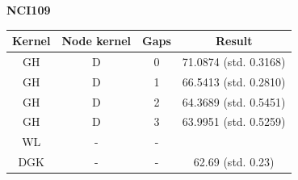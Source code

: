 \documentclass{article}
\begin{document}
\textbf{NCI109}\\
\begin{minipage}{0.6\linewidth}
	\hspace*{-1in}

	\label{fig:nci109}
\end{minipage}
\begin{minipage}[c]{0.5\linewidth}
	
	\centering
	\begin{tabular}{c|c|c|c}
		Kernel & Node kernel & Gaps & Result\\
		\hline
		GH & D & 0 & 71.0874 (std. 0.3168)\\
		GH & D & 1 & 66.5413 (std. 0.2810)\\
		GH & D & 2 & 64.3689 (std. 0.5451)\\
		GH & D & 3 & 63.9951 (std. 0.5259)\\
		WL & - & - & \\
		DGK & - & - & 62.69 (std. 0.23)
	\end{tabular}
	\label{table:nci109}
\end{minipage}
\end{document}
